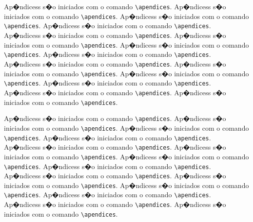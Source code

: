 Ap�ndicess s�o iniciados com o comando \verb|\apendices|.
Ap�ndicess s�o iniciados com o comando \verb|\apendices|.
Ap�ndicess s�o iniciados com o comando \verb|\apendices|.
Ap�ndicess s�o iniciados com o comando \verb|\apendices|.
Ap�ndicess s�o iniciados com o comando \verb|\apendices|.
Ap�ndicess s�o iniciados com o comando \verb|\apendices|.
Ap�ndicess s�o iniciados com o comando \verb|\apendices|.
Ap�ndicess s�o iniciados com o comando \verb|\apendices|.
Ap�ndicess s�o iniciados com o comando \verb|\apendices|.
Ap�ndicess s�o iniciados com o comando \verb|\apendices|.
Ap�ndicess s�o iniciados com o comando \verb|\apendices|.
Ap�ndicess s�o iniciados com o comando \verb|\apendices|.
Ap�ndicess s�o iniciados com o comando \verb|\apendices|.
Ap�ndicess s�o iniciados com o comando \verb|\apendices|.

Ap�ndicess s�o iniciados com o comando \verb|\apendices|.
Ap�ndicess s�o iniciados com o comando \verb|\apendices|.
Ap�ndicess s�o iniciados com o comando \verb|\apendices|.
Ap�ndicess s�o iniciados com o comando \verb|\apendices|.
Ap�ndicess s�o iniciados com o comando \verb|\apendices|.
Ap�ndicess s�o iniciados com o comando \verb|\apendices|.
Ap�ndicess s�o iniciados com o comando \verb|\apendices|.
Ap�ndicess s�o iniciados com o comando \verb|\apendices|.
Ap�ndicess s�o iniciados com o comando \verb|\apendices|.
Ap�ndicess s�o iniciados com o comando \verb|\apendices|.
Ap�ndicess s�o iniciados com o comando \verb|\apendices|.
Ap�ndicess s�o iniciados com o comando \verb|\apendices|.
Ap�ndicess s�o iniciados com o comando \verb|\apendices|.
Ap�ndicess s�o iniciados com o comando \verb|\apendices|.
